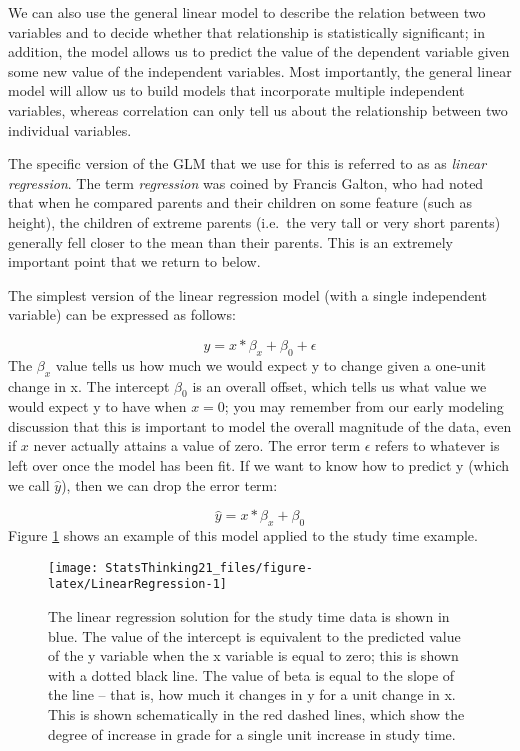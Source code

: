 \documentclass[]{book}
\theoremstyle{definition}
\theoremstyle{definition}
\theoremstyle{definition}
\theoremstyle{remark}
\begin{document}
We can also use the general linear model to describe the relation
between two variables and to decide whether that relationship is
statistically significant; in addition, the model allows us to predict
the value of the dependent variable given some new value of the
independent variables. Most importantly, the general linear model will
allow us to build models that incorporate multiple independent
variables, whereas correlation can only tell us about the relationship
between two individual variables.

The specific version of the GLM that we use for this is referred to as
as \emph{linear regression}. The term \emph{regression} was coined by
Francis Galton, who had noted that when he compared parents and their
children on some feature (such as height), the children of extreme
parents (i.e.~the very tall or very short parents) generally fell closer
to the mean than their parents. This is an extremely important point
that we return to below.

The simplest version of the linear regression model (with a single
independent variable) can be expressed as follows:

\[
y = x * \beta_x + \beta_0 + \epsilon
\] The \(\beta_x\) value tells us how much we would expect y to change
given a one-unit change in x. The intercept \(\beta_0\) is an overall
offset, which tells us what value we would expect y to have when
\(x=0\); you may remember from our early modeling discussion that this
is important to model the overall magnitude of the data, even if \(x\)
never actually attains a value of zero. The error term \(\epsilon\)
refers to whatever is left over once the model has been fit. If we want
to know how to predict y (which we call \(\hat{y}\)), then we can drop
the error term:

\[
\hat{y} = x * \beta_x + \beta_0 
\] Figure \ref{fig:LinearRegression} shows an example of this model
applied to the study time example.

\begin{figure}
\texttt{[image: StatsThinking21\_files/figure-latex/LinearRegression-1]} \caption{The linear regression solution for the study time data is shown in blue. The value of the intercept is equivalent to the predicted value of the y variable when the x variable is equal to zero; this is shown with a dotted black line.  The value of beta is equal to the slope of the line -- that is, how much it changes in y for a unit change in x.  This is shown schematically in the red dashed lines, which show the degree of increase in grade for a single unit increase in study time.}\label{fig:LinearRegression}
\end{figure}
\end{document}
